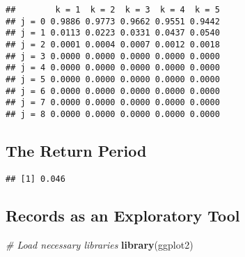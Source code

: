 \documentclass[
  12pt,
]{article}
\newenvironment{Shaded}{\begin{snugshade}}{\end{snugshade}}
\newcommand{\AttributeTok}[1]{\textcolor[rgb]{0.13,0.29,0.53}{#1}}
\newcommand{\CommentTok}[1]{\textcolor[rgb]{0.56,0.35,0.01}{\textit{#1}}}
\newcommand{\DecValTok}[1]{\textcolor[rgb]{0.00,0.00,0.81}{#1}}
\newcommand{\FloatTok}[1]{\textcolor[rgb]{0.00,0.00,0.81}{#1}}
\newcommand{\FunctionTok}[1]{\textcolor[rgb]{0.13,0.29,0.53}{\textbf{#1}}}
\newcommand{\NormalTok}[1]{#1}
\newcommand{\OtherTok}[1]{\textcolor[rgb]{0.56,0.35,0.01}{#1}}
\newcommand{\SpecialCharTok}[1]{\textcolor[rgb]{0.81,0.36,0.00}{\textbf{#1}}}
\begin{document}
\begin{verbatim}
##        k = 1  k = 2  k = 3  k = 4  k = 5
## j = 0 0.9886 0.9773 0.9662 0.9551 0.9442
## j = 1 0.0113 0.0223 0.0331 0.0437 0.0540
## j = 2 0.0001 0.0004 0.0007 0.0012 0.0018
## j = 3 0.0000 0.0000 0.0000 0.0000 0.0000
## j = 4 0.0000 0.0000 0.0000 0.0000 0.0000
## j = 5 0.0000 0.0000 0.0000 0.0000 0.0000
## j = 6 0.0000 0.0000 0.0000 0.0000 0.0000
## j = 7 0.0000 0.0000 0.0000 0.0000 0.0000
## j = 8 0.0000 0.0000 0.0000 0.0000 0.0000
\end{verbatim}

\subsection{The Return Period}\label{the-return-period}

\begin{Shaded}
\end{Shaded}

\begin{verbatim}
## [1] 0.046
\end{verbatim}

\subsection{Records as an Exploratory
Tool}\label{records-as-an-exploratory-tool}

\begin{Shaded}
\begin{Highlighting}[]
\CommentTok{\# Load necessary libraries}
\FunctionTok{library}\NormalTok{(ggplot2)}
\end{Highlighting}
\end{Shaded}
\end{document}
